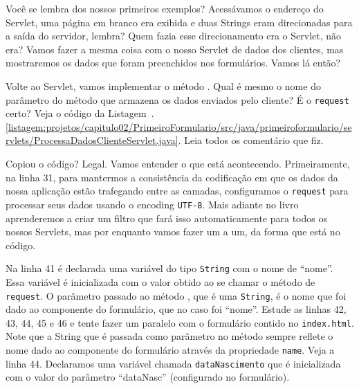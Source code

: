 Você se lembra dos nossos primeiros exemplos? Acessávamos o endereço do Servlet, uma página em branco era exibida e duas Strings eram direcionadas para a saída do servidor, lembra? Quem fazia esse direcionamento era o Servlet, não era? Vamos fazer a mesma coisa com o nosso Servlet de dados dos clientes, mas mostraremos os dados que foram preenchidos nos formulários. Vamos lá então?

Volte ao Servlet, vamos implementar o método . Qual é mesmo o nome do parâmetro do método  que armazena os dados enviados pelo cliente? É o \texttt{request} certo? Veja o código da Listagem~\thechapter.\ref{listagem:projetos/capitulo02/PrimeiroFormulario/src/java/primeiroformulario/servlets/ProcessaDadosClienteServlet.java}. Leia todos os comentário que fiz.


Copiou o código? Legal. Vamos entender o que está acontecendo. Primeiramente, na linha 31, para mantermos a consistência da codificação em que os dados da nossa aplicação estão trafegando entre as camadas, configuramos o \texttt{request} para processar seus dados usando o encoding \texttt{UTF-8}. Mais adiante no livro aprenderemos a criar um filtro que fará isso automaticamente para todos os nossos Servlets, mas por enquanto vamos fazer um a um, da forma que está no código.

Na linha 41 é declarada uma variável do tipo \texttt{String} com o nome de ``nome''. Essa variável é inicializada com o valor obtido ao se chamar o método\linebreak%
 de \texttt{request}. O parâmetro passado ao método , que é uma \texttt{String}, é o nome que foi dado ao componente do formulário, que no caso foi ``nome''. Estude as linhas 42, 43, 44, 45 e 46 e tente fazer um paralelo com o formulário contido no \texttt{index.html}. Note que a String que é passada como parâmetro no método  sempre reflete o nome dado ao componente do formulário através da propriedade \texttt{name}. Veja a linha 44. Declaramos uma variável chamada \texttt{dataNascimento} que é inicializada com o valor do parâmetro ``dataNasc'' (configurado no formulário).

